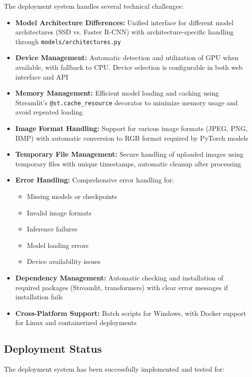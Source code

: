 \documentclass[12pt,a4paper]{article}
\begin{document}
The deployment system handles several technical challenges:

\begin{itemize}
    \item \textbf{Model Architecture Differences:} Unified interface for different model architectures (SSD vs. Faster R-CNN) with architecture-specific handling through \texttt{models/architectures.py}
    \item \textbf{Device Management:} Automatic detection and utilization of GPU when available, with fallback to CPU. Device selection is configurable in both web interface and API
    \item \textbf{Memory Management:} Efficient model loading and caching using Streamlit's \texttt{@st.cache\_resource} decorator to minimize memory usage and avoid repeated loading
    \item \textbf{Image Format Handling:} Support for various image formats (JPEG, PNG, BMP) with automatic conversion to RGB format required by PyTorch models
    \item \textbf{Temporary File Management:} Secure handling of uploaded images using temporary files with unique timestamps, automatic cleanup after processing
    \item \textbf{Error Handling:} Comprehensive error handling for:
    \begin{itemize}
        \item Missing models or checkpoints
        \item Invalid image formats
        \item Inference failures
        \item Model loading errors
        \item Device availability issues
    \end{itemize}
    \item \textbf{Dependency Management:} Automatic checking and installation of required packages (Streamlit, transformers) with clear error messages if installation fails
    \item \textbf{Cross-Platform Support:} Batch scripts for Windows, with Docker support for Linux and containerized deployments
\end{itemize}

\subsection{Deployment Status}

The deployment system has been successfully implemented and tested for:
\end{document}

